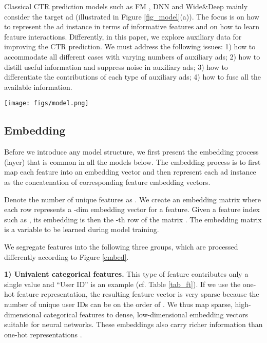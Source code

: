 \documentclass[sigconf]{acmart}
\begin{document}
Classical CTR prediction models such as FM \cite{rendle2010factorization}, DNN \cite{zhang2016deep} and Wide\&Deep \cite{cheng2016wide} mainly consider the target ad (illustrated in Figure \ref{fig_model}(a)). The focus is on how to represent the ad instance in terms of informative features and on how to learn feature interactions.
Differently, in this paper, we explore auxiliary data for improving the CTR prediction. We must address the following issues: 1) how to accommodate all different cases with varying numbers of auxiliary ads; 2) how to distill useful information and suppress noise in auxiliary ads; 3) how to differentiate the contributions of each type of auxiliary ads; 4) how to fuse all the available information.

\begin{figure*}[!t]
\centering
\texttt{[image: figs/model.png]}
\vskip -8pt
\caption{Illustration of model architectures (fts - features). (a) DNN model, which considers only the target ad. (b) DSTN - Pooling model, which further considers auxiliary ads. The aggregation of each type of auxiliary ads is by sum pooling. (c) DSTN - Interactive attention model, which introduces explicit interaction between the auxiliary ads and the target ad.}
\vskip -5pt
\label{fig_model}
\end{figure*}

\subsection{Embedding}
Before we introduce any model structure, we first present the embedding process (layer) that is common in all the models below.
The embedding process is to first map each feature into an embedding vector and then represent each ad instance as the concatenation of corresponding feature embedding vectors.

Denote the number of unique features as . We create an embedding matrix  where each row represents a -dim embedding vector for a feature. Given a feature index such as , its embedding is then the -th row of the matrix . The embedding matrix  is a variable to be learned during model training.

We segregate features into the following three groups, which are processed differently according to Figure \ref{embed}.

\textbf{1) Univalent categorical features.} This type of feature contributes only a single value and ``User ID'' is an example (cf. Table \ref{tab_ft}). If we use the one-hot feature representation, the resulting feature vector is very sparse because the number of unique user IDs can be on the order of . We thus map sparse, high-dimensional categorical features to dense, low-dimensional embedding vectors suitable for neural networks. These embeddings also carry richer information than one-hot representations \cite{mikolov2013distributed}.
\end{document}
